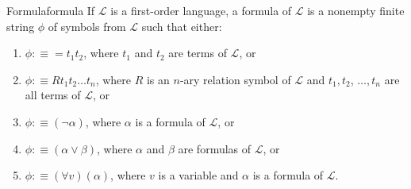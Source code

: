 \begin{definition}{Formula}{formula}
If $\mathcal{L}$ is a first-order language, a formula of $\mathcal{L}$ is a nonempty finite string $\phi$ of symbols from $\mathcal{L}$ such that either:
\begin{enumerate}
    \item $\phi: \equiv=t_{1} t_{2}$, where $t_{1}$ and $t_{2}$ are terms of $\mathcal{L}$, or
    \item $\phi: \equiv R t_{1} t_{2} \ldots t_{n}$, where $R$ is an $n$-ary relation symbol of $\mathcal{L}$ and $t_{1}, t_{2}$, $\ldots, t_{n}$ are all terms of $\mathcal{L}$, or
    \item $\phi: \equiv(\neg \alpha)$, where $\alpha$ is a formula of $\mathcal{L}$, or
    \item $\phi: \equiv(\alpha \vee \beta)$, where $\alpha$ and $\beta$ are formulas of $\mathcal{L}$, or
    \item $\phi: \equiv(\forall v)(\alpha)$, where $v$ is a variable and $\alpha$ is a formula of $\mathcal{L}$.
\end{enumerate}
\end{definition}
